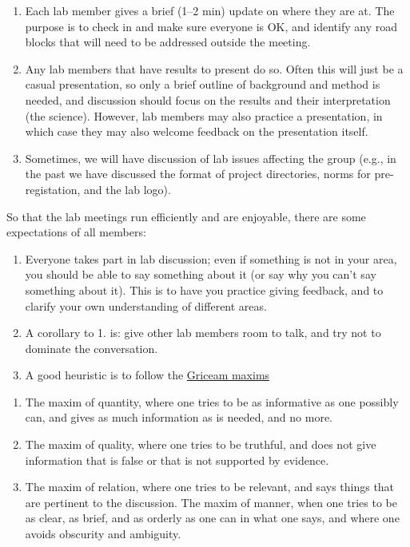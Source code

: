 \documentclass[]{book}
\providecommand{\tightlist}{%
  \setlength{\itemsep}{0pt}\setlength{\parskip}{0pt}}
\theoremstyle{definition}
\theoremstyle{definition}
\theoremstyle{definition}
\theoremstyle{remark}
\begin{document}
\begin{enumerate}
\def\labelenumi{\arabic{enumi}.}
\tightlist
\item
  Each lab member gives a brief (1--2 min) update on where they are at.
  The purpose is to check in and make sure everyone is OK, and identify
  any road blocks that will need to be addressed outside the meeting.
\item
  Any lab members that have results to present do so. Often this will
  just be a casual presentation, so only a brief outline of background
  and method is needed, and discussion should focus on the results and
  their interpretation (the science). However, lab members may also
  practice a presentation, in which case they may also welcome feedback
  on the presentation itself.
\item
  Sometimes, we will have discussion of lab issues affecting the group
  (e.g., in the past we have discussed the format of project
  directories, norms for pre-registation, and the lab logo).
\end{enumerate}

So that the lab meetings run efficiently and are enjoyable, there are
some expectations of all members:

\begin{enumerate}
\def\labelenumi{\arabic{enumi}.}
\item
  Everyone takes part in lab discussion; even if something is not in
  your area, you should be able to say something about it (or say why
  you can't say something about it). This is to have you practice giving
  feedback, and to clarify your own understanding of different areas.
\item
  A corollary to 1. is: give other lab members room to talk, and try not
  to dominate the conversation.
\item
  A good heuristic is to follow the \href{link}{Griceam maxims}
\end{enumerate}

\begin{enumerate}
\def\labelenumi{\alph{enumi}.}
\tightlist
\item
  The maxim of quantity, where one tries to be as informative as one
  possibly can, and gives as much information as is needed, and no more.
\item
  The maxim of quality, where one tries to be truthful, and does not
  give information that is false or that is not supported by evidence.
\item
  The maxim of relation, where one tries to be relevant, and says things
  that are pertinent to the discussion. The maxim of manner, when one
  tries to be as clear, as brief, and as orderly as one can in what one
  says, and where one avoids obscurity and ambiguity.
\end{enumerate}
\end{document}
